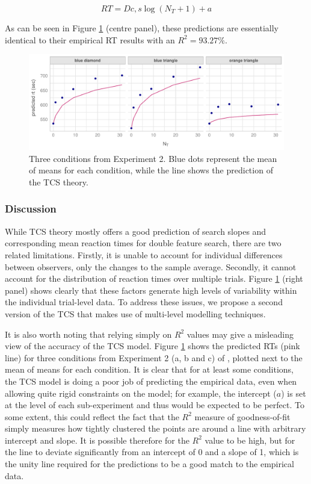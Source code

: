 \documentclass[smallextended, natbib]{svjour3}       %
\begin{document}
\begin{equation}
RT = D{c,s}\log(N_T+1) + a
\end{equation}

As can be seen in  Figure \ref{fig:comp_rep} (centre panel), these predictions are essentially identical to their empirical RT results with an $R^2 = 93.27\%$. 

\begin{figure}
\centering
\includegraphics[width=\textwidth]{../plots/computational_replication_rt.pdf}
\caption{Three conditions from Experiment 2. Blue dots represent the mean of means for each condition, while the line shows the prediction of the TCS theory.}
\label{fig:comp_rep}
\end{figure}


\subsubsection{Discussion}

While TCS theory mostly offers a good prediction of search slopes and corresponding mean reaction times for double feature search, there are two related limitations. Firstly, it is unable to account for individual differences between observers, only the changes to the sample average. Secondly, it cannot account for the distribution of reaction times over multiple trials. Figure \ref{fig:comp_rep} (right panel) shows clearly that these factors generate high levels of variability within the individual trial-level data. To address these issues, we propose a second version of the TCS that makes use of multi-level modelling techniques.

It is also worth noting that relying simply on $R^2$ values may give a misleading view of the accuracy of the TCS model. Figure \ref{fig:comp_rep} shows the predicted RTs (pink line) for three conditions from Experiment 2 (a, b and c) of \citep{buetti2019predicting}, plotted next to the mean of means for each condition. It is clear that for at least some conditions, the TCS model is doing a poor job of predicting the empirical data, even when allowing quite rigid constraints on the model; for example, the intercept ($a$) is set at the level of each sub-experiment and thus would be expected to be perfect. To some extent, this could reflect the fact that the $R^2$ measure of goodness-of-fit simply measures how tightly clustered the points are around a line with arbitrary intercept and slope. It is possible therefore for the $R^2$ value to be high, but for the line to deviate significantly from an intercept of 0 and a slope of 1, which is the unity line required for the predictions to be a good match to the empirical data.
\end{document}
